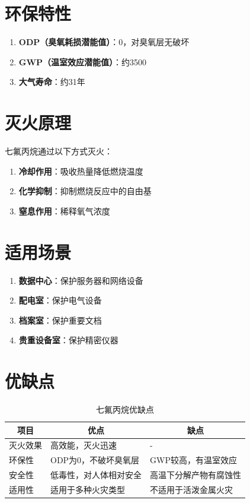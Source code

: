 \documentclass[12pt,UTF8]{ctexbook}
\begin{document}
\section{环保特性}

\begin{enumerate}
    \item \textbf{ODP（臭氧耗损潜能值）}：0，对臭氧层无破坏
    \item \textbf{GWP（温室效应潜能值）}：约3500
    \item \textbf{大气寿命}：约31年
\end{enumerate}

\section{灭火原理}

七氟丙烷通过以下方式灭火：

\begin{enumerate}
    \item \textbf{冷却作用}：吸收热量降低燃烧温度
    \item \textbf{化学抑制}：抑制燃烧反应中的自由基
    \item \textbf{窒息作用}：稀释氧气浓度
\end{enumerate}

\section{适用场景}

\begin{enumerate}
    \item \textbf{数据中心}：保护服务器和网络设备
    \item \textbf{配电室}：保护电气设备
    \item \textbf{档案室}：保护重要文档
    \item \textbf{贵重设备室}：保护精密仪器
\end{enumerate}

\section{优缺点}

\begin{table}[H]
    \centering
    \begin{tabularx}{\textwidth}{|p{3cm}|X|X|}
        \hline
        \multicolumn{1}{|c|}{\textbf{项目}} & \multicolumn{1}{c|}{\textbf{优点}} & \multicolumn{1}{c|}{\textbf{缺点}} \\
        \hline
        灭火效果 & 高效能，灭火迅速 & - \\
        \hline
        环保性 & ODP为0，不破坏臭氧层 & GWP较高，有温室效应 \\
        \hline
        安全性 & 低毒性，对人体相对安全 & 高温下分解产物有腐蚀性 \\
        \hline
        适用性 & 适用于多种火灾类型 & 不适用于活泼金属火灾 \\
        \hline
    \end{tabularx}
    \caption{七氟丙烷优缺点}
    \label{tab:hfc227_pros_cons}
\end{table}
\end{document}
